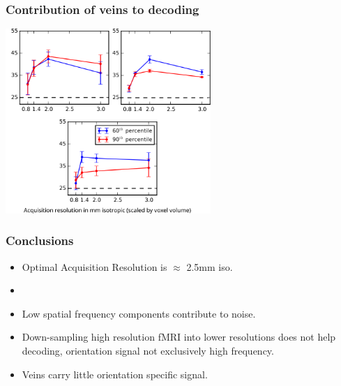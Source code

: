 \documentclass{beamer}
\begin{document}
  \begin{frame}
    \frametitle{Contribution of veins to decoding}
        \begin{center}
            \includegraphics[height=7cm]{pics/veins}
        \end{center}
    \end{frame} 

  \begin{frame}
    \frametitle{Conclusions}
        \begin{center}
        \begin{itemize}
         \item Optimal Acquisition Resolution is $\approx$ 2.5mm iso.
         \item 
         \item Low spatial frequency components contribute to noise.
         \item Down-sampling high resolution fMRI into lower resolutions 
         does not help decoding, orientation signal not exclusively high frequency.
         \item Veins carry little orientation specific signal.
        \end{itemize}  
        \end{center}
    \end{frame} 
                    
\end{document}
